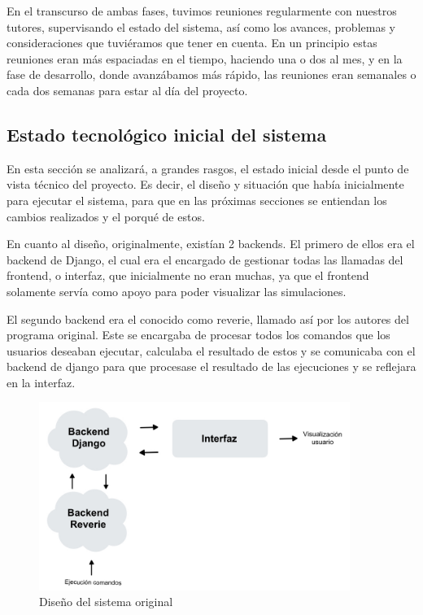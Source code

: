 En el transcurso de ambas fases, tuvimos reuniones regularmente con nuestros tutores, supervisando el estado del sistema, así como los avances, problemas y consideraciones que tuviéramos que tener en cuenta. En un principio estas reuniones eran más espaciadas en el tiempo, haciendo una o dos al mes, y en la fase de desarrollo, donde avanzábamos más rápido, las reuniones eran semanales o cada dos semanas para estar al día del proyecto.



\subsection{Estado tecnológico inicial del sistema}

En esta sección se analizará, a grandes rasgos, el estado inicial desde el punto de vista técnico del proyecto. Es decir, el diseño y situación que había inicialmente para ejecutar el sistema, para que en las próximas secciones se entiendan los cambios realizados y el porqué de estos.

En cuanto al diseño, originalmente, existían 2 backends. El primero de ellos era el backend de Django, el cual era el encargado de gestionar todas las llamadas del frontend, o interfaz, que inicialmente no eran muchas, ya que el frontend solamente servía como apoyo para poder visualizar las simulaciones. 

El segundo backend era el conocido como reverie, llamado así por los autores del programa original. Este se encargaba de procesar todos los comandos que los usuarios deseaban ejecutar, calculaba el resultado de estos y se comunicaba con el backend de django para que procesase el resultado de las ejecuciones y se reflejara en la interfaz.

\begin{figure}[h]
	\centering
	\includegraphics[width = 0.9\textwidth]{Imagenes/Vectorial/disenoSistemaOriginal.jpeg}
	\caption{Diseño del sistema original}
	\label{fig:sistemaOriginal}
\end{figure}


